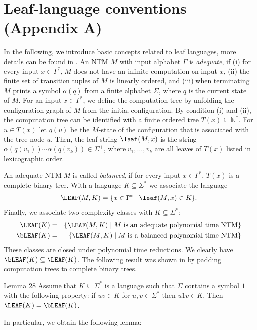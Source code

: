 \section*{Leaf-language conventions (Appendix A)}

In the following, we introduce basic concepts
related to leaf languages, more details can be found in  \cite{ref11,ref23,ref25,ref24,ref29}.
An NTM $M$ with input alphabet $\Gamma$ is \emph{adequate}, if 
(i) for every input $x \in \Gamma^*$, $M$ does not have an infinite 
computation on input $x$, (ii) the finite set of transition tuples
of $M$ is linearly ordered, and (iii) when terminating $M$ prints a symbol $\alpha(q)$ from a finite alphabet $\Sigma$, where $q$ is 
 the current state of $M$.
For an input $x \in \Gamma^*$, we define the computation tree
by unfolding the configuration
graph of $M$ from the initial configuration. 
By condition (i) and (ii), the computation
tree can be identified with a  
finite ordered tree $T(x) \subseteq \mathbb{N}^*$.
For $u \in T(x)$ let $q(u)$ be the $M$-state of 
the configuration that is associated with the 
tree node $u$.
Then, the leaf string $\leaf(M,x)$
is the string $\alpha(q(v_1)) \cdots \alpha(q(v_k)) \in \Sigma^+$, where 
$v_1,\ldots,v_k$ are all leaves of $T(x)$ listed in lexicographic order.

An adequate NTM $M$ is called  \emph{balanced}, if for every input $x \in \Gamma^*$,
$T(x)$ is a complete binary tree.
With a language $K \subseteq\Sigma^*$ we associate 
the language 
$$
\LEAF(M,K) = \{ x \in  \Gamma^* \mid \leaf(M,x) \in K \}.
$$
Finally, we associate two complexity classes with $K \subseteq\Sigma^*$:
\begin{eqnarray*}
\LEAF(K) &=& \{ \LEAF(M,K) \mid \text{$M$ is an adequate polynomial time
    NTM}\}\\
\bLEAF(K) &=& \{ \LEAF(M,K) \mid \text{$M$ is a balanced polynomial time NTM}\}
\end{eqnarray*}
These classes are closed under polynomial time reductions.
We clearly have $\bLEAF(K)  \subseteq \LEAF(K)$.
The following result was shown in \cite{ref29} by padding computation trees to complete binary trees.

\begin{authorclaim}{Lemma 28}
Assume that $K \subseteq \Sigma^*$ is a language such that $\Sigma$ contains a symbol $1$ with the following property:
if $uv \in K$ for $u,v \in \Sigma^*$ then $u1v \in K$. Then $\LEAF(K)  = \bLEAF(K)$. 
\end{authorclaim}
In particular, we obtain the following lemma:

